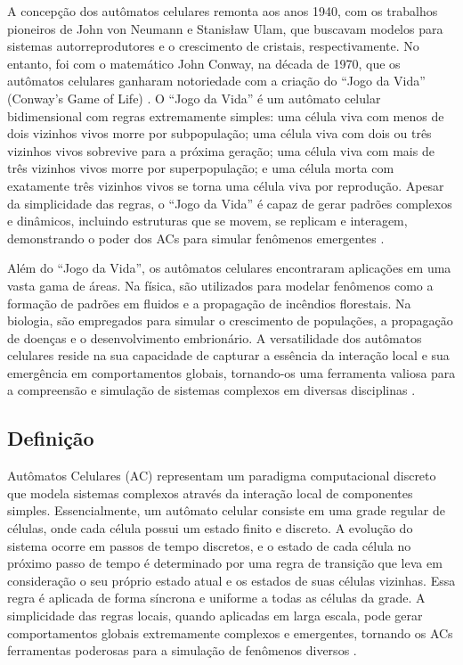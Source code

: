 \documentclass[12pt,oneside]{report}
\begin{document}
A concepção dos autômatos celulares remonta aos anos 1940, com os trabalhos pioneiros de John von Neumann e Stanisław Ulam, que buscavam modelos para sistemas autorreprodutores e o crescimento de cristais, respectivamente. No entanto, foi com o matemático John Conway, na década de 1970, que os autômatos celulares ganharam notoriedade com a criação do ``Jogo da Vida'' (Conway's Game of Life) \cite{Gardner1970}. O ``Jogo da Vida'' é um autômato celular bidimensional com regras extremamente simples: uma célula viva com menos de dois vizinhos vivos morre por subpopulação; uma célula viva com dois ou três vizinhos vivos sobrevive para a próxima geração; uma célula viva com mais de três vizinhos vivos morre por superpopulação; e uma célula morta com exatamente três vizinhos vivos se torna uma célula viva por reprodução. Apesar da simplicidade das regras, o ``Jogo da Vida'' é capaz de gerar padrões complexos e dinâmicos, incluindo estruturas que se movem, se replicam e interagem, demonstrando o poder dos ACs para simular fenômenos emergentes \cite{Gardner1970}.

Além do ``Jogo da Vida'', os autômatos celulares encontraram aplicações em uma vasta gama de áreas. Na física, são utilizados para modelar fenômenos como a formação de padrões em fluidos e a propagação de incêndios florestais. Na biologia, são empregados para simular o crescimento de populações, a propagação de doenças e o desenvolvimento embrionário. A versatilidade dos autômatos celulares reside na sua capacidade de capturar a essência da interação local e sua emergência em comportamentos globais, tornando-os uma ferramenta valiosa para a compreensão e simulação de sistemas complexos em diversas disciplinas \cite{kier2005}.

\subsection{Definição}

Autômatos Celulares (AC) representam um paradigma computacional discreto que modela sistemas complexos através da interação local de componentes simples. Essencialmente, um autômato celular consiste em uma grade regular de células, onde cada célula possui um estado finito e discreto. A evolução do sistema ocorre em passos de tempo discretos, e o estado de cada célula no próximo passo de tempo é determinado por uma regra de transição que leva em consideração o seu próprio estado atual e os estados de suas células vizinhas. Essa regra é aplicada de forma síncrona e uniforme a todas as células da grade. A simplicidade das regras locais, quando aplicadas em larga escala, pode gerar comportamentos globais extremamente complexos e emergentes, tornando os ACs ferramentas poderosas para a simulação de fenômenos diversos \cite{kier2005}.
\end{document}
